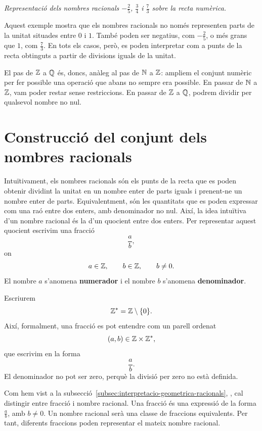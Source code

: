 \begin{solucio}
\begin{center}
\begin{tikzpicture}[scale=1.15]
		\end{tikzpicture}
		
		\smallskip
		\textit{Representació dels nombres racionals \(-\frac{2}{5}\), \(\frac{3}{4}\) i \(\frac{7}{3}\) sobre la recta numèrica.}
	\end{center}
	
	Aquest exemple mostra que els nombres racionals no només representen parts de la unitat situades entre \(0\) i \(1\). També poden ser negatius, com \(-\frac{2}{5}\), o més grans que \(1\), com \(\frac{7}{3}\). En tots els casos, però, es poden interpretar com a punts de la recta obtinguts a partir de divisions iguals de la unitat.
\end{solucio}

El pas de \(\mathbb{Z}\) a \(\mathbb{Q}\) és, doncs, anàleg al pas de \(\mathbb{N}\) a \(\mathbb{Z}\): ampliem el conjunt numèric per fer possible una operació que abans no sempre era possible. En passar de \(\mathbb{N}\) a \(\mathbb{Z}\), vam poder restar sense restriccions. En passar de \(\mathbb{Z}\) a \(\mathbb{Q}\), podrem dividir per qualsevol nombre no nul.

\section{Construcció del conjunt dels nombres racionals}

Intuïtivament, els nombres racionals són els punts de la recta que es poden obtenir dividint la unitat en un nombre enter de parts iguals i prenent-ne un nombre enter de parts. Equivalentment, són les quantitats que es poden expressar com una raó entre dos enters, amb denominador no nul. Així, la idea intuïtiva d'un nombre racional és la d'un quocient entre dos enters. Per representar aquest quocient escrivim una fracció
\[
\frac{a}{b},
\]
on
\[
a\in\mathbb{Z},\qquad b\in\mathbb{Z},\qquad b\neq0.
\]
El nombre \(a\) s'anomena \textbf{numerador} i el nombre \(b\) s'anomena \textbf{denominador}.

Escriurem
\[
\mathbb{Z}^{*}=\mathbb{Z}\setminus\{0\}.
\]
Així, formalment, una fracció es pot entendre com un parell ordenat
\[
(a,b)\in\mathbb{Z}\times\mathbb{Z}^{*},
\]
que escrivim en la forma
\[
\frac{a}{b}.
\]
El denominador no pot ser zero, perquè la divisió per zero no està definida.

\begin{observacio}
	Com hem vist a la subsecció~\ref{subsec:interpretacio-geometrica-racionals},
	\emph{}, cal distingir entre fracció i nombre racional. Una fracció és una expressió de la forma \(\frac{a}{b}\), amb \(b\neq0\). Un nombre racional serà una classe de fraccions equivalents. Per tant, diferents fraccions poden representar el mateix nombre racional.
\end{observacio}

